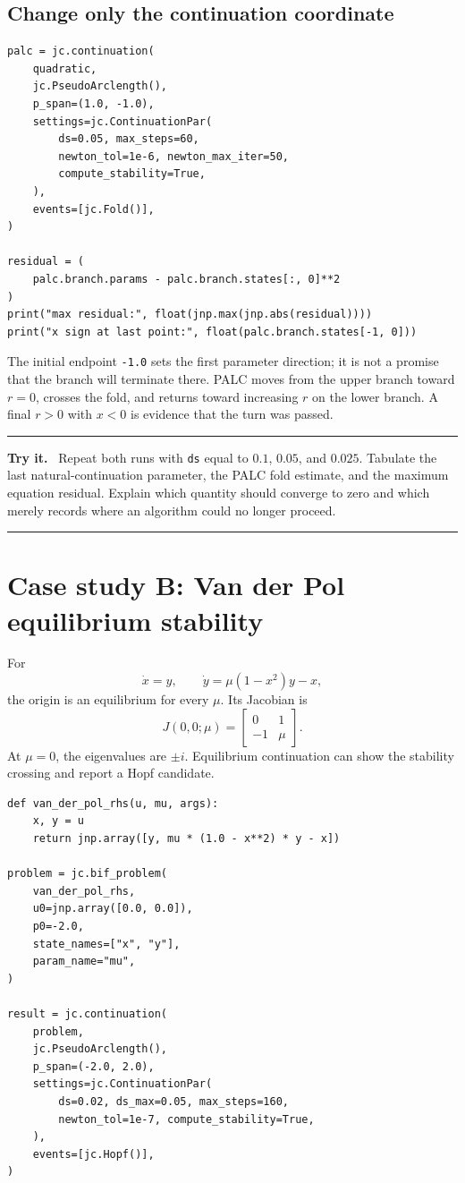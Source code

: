 \documentclass[11pt,oneside]{book}
\newenvironment{trythis}
  {\par\medskip\noindent\begin{minipage}{\textwidth}
   \color{JaxTeal}\rule{\textwidth}{0.8pt}\par
   \textbf{Try it.}\ \color{black}}
  {\par\color{JaxTeal}\rule{\textwidth}{0.8pt}
   \end{minipage}\par\medskip}
\begin{document}
\subsection{Change only the continuation coordinate}

\begin{lstlisting}
palc = jc.continuation(
    quadratic,
    jc.PseudoArclength(),
    p_span=(1.0, -1.0),
    settings=jc.ContinuationPar(
        ds=0.05, max_steps=60,
        newton_tol=1e-6, newton_max_iter=50,
        compute_stability=True,
    ),
    events=[jc.Fold()],
)

residual = (
    palc.branch.params - palc.branch.states[:, 0]**2
)
print("max residual:", float(jnp.max(jnp.abs(residual))))
print("x sign at last point:", float(palc.branch.states[-1, 0]))
\end{lstlisting}

The initial endpoint \texttt{-1.0} sets the first parameter direction; it is
not a promise that the branch will terminate there. PALC moves from the upper
branch toward $r=0$, crosses the fold, and returns toward increasing $r$ on
the lower branch. A final $r>0$ with $x<0$ is evidence that the turn was
passed.

\begin{trythis}
Repeat both runs with \texttt{ds} equal to $0.1$, $0.05$, and $0.025$.
Tabulate the last natural-continuation parameter, the PALC fold estimate, and
the maximum equation residual. Explain which quantity should converge to zero
and which merely records where an algorithm could no longer proceed.
\end{trythis}

\section{Case study B: Van der Pol equilibrium stability}

For
\[
  \dot x=y,\qquad
  \dot y=\mu(1-x^2)y-x,
\]
the origin is an equilibrium for every $\mu$. Its Jacobian is
\[
  J(0,0;\mu)=
  \begin{bmatrix}0&1\\-1&\mu\end{bmatrix}.
\]
At $\mu=0$, the eigenvalues are $\pm i$. Equilibrium continuation can show the
stability crossing and report a Hopf candidate.

\begin{lstlisting}
def van_der_pol_rhs(u, mu, args):
    x, y = u
    return jnp.array([y, mu * (1.0 - x**2) * y - x])

problem = jc.bif_problem(
    van_der_pol_rhs,
    u0=jnp.array([0.0, 0.0]),
    p0=-2.0,
    state_names=["x", "y"],
    param_name="mu",
)

result = jc.continuation(
    problem,
    jc.PseudoArclength(),
    p_span=(-2.0, 2.0),
    settings=jc.ContinuationPar(
        ds=0.02, ds_max=0.05, max_steps=160,
        newton_tol=1e-7, compute_stability=True,
    ),
    events=[jc.Hopf()],
)
\end{lstlisting}
\end{document}
